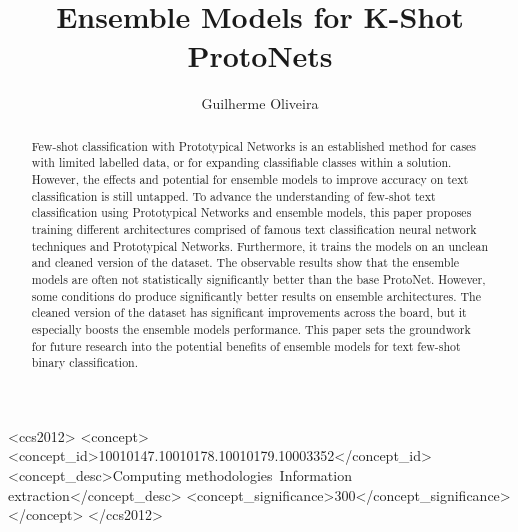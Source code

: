 \documentclass[manuscript, anonymous=true, review=true]{acmart}
\begin{document}
\title{Ensemble Models for K-Shot ProtoNets}

\author{Guilherme Oliveira}

\begin{CCSXML}
<ccs2012>
   <concept>
       <concept_id>10010147.10010178.10010179.10003352</concept_id>
       <concept_desc>Computing methodologies~Information extraction</concept_desc>
       <concept_significance>300</concept_significance>
       </concept>
 </ccs2012>
\end{CCSXML}


\begin{abstract}
  Few-shot classification with Prototypical Networks is an established method for cases with limited labelled data, or for expanding classifiable classes within a solution. However, the effects and potential for ensemble models to improve accuracy on text classification is still untapped.
  To advance the understanding of few-shot text classification using Prototypical Networks and ensemble models, this paper proposes training different architectures comprised of famous text classification neural network techniques and Prototypical Networks. Furthermore, it trains the models on an unclean and cleaned version of the dataset.
  The observable results show that the ensemble models are often not statistically significantly better than the base ProtoNet. However, some conditions do produce significantly better results on ensemble architectures.
  The cleaned version of the dataset has significant improvements across the board, but it especially boosts the ensemble models performance.
  This paper sets the groundwork for future research into the potential benefits of ensemble models for text few-shot binary classification. 
\end{abstract}
\end{document}
